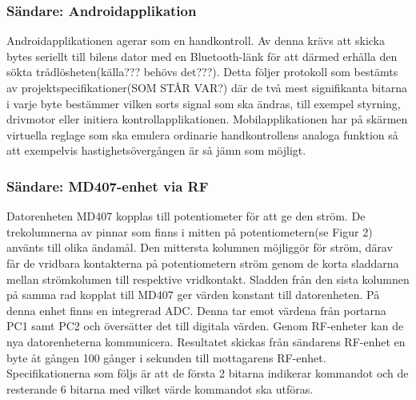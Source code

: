 \documentclass[a4paper]{article}
\begin{document}
\subsubsection{Sändare: Androidapplikation}
Androidapplikationen agerar som en handkontroll. Av denna krävs att skicka bytes seriellt till bilens dator med en Bluetooth-länk för att därmed erhålla den sökta trådlösheten(källa??? behövs det???). Detta följer protokoll som bestämts av projektspecifikationer(SOM STÅR VAR?) där de två mest signifikanta bitarna i varje byte bestämmer vilken sorts signal som ska ändras, till exempel styrning, drivmotor eller initiera kontrollapplikationen. Mobilapplikationen har på skärmen virtuella reglage som ska emulera ordinarie handkontrollens analoga funktion så att exempelvis hastighetsövergången är så jämn som möjligt.

\subsubsection{Sändare: MD407-enhet via RF}
Datorenheten MD407 kopplas till potentiometer för att ge den ström. De trekolumnerna av pinnar som finns i mitten på potentiometern(se Figur 2) använts till olika ändamål. Den mittersta kolumnen möjliggör för ström, därav får de vridbara kontakterna på potentiometern ström genom de korta sladdarna mellan strömkolumen till respektive vridkontakt. Sladden från den sista kolumnen på samma rad kopplat till MD407 ger värden konstant till datorenheten. På denna enhet finns en integrerad ADC. Denna tar emot värdena från portarna PC1 samt PC2 och översätter det till digitala värden. Genom RF-enheter kan de nya datorenheterna kommunicera. Resultatet skickas från sändarens RF-enhet en byte åt gången 100 gånger i sekunden till mottagarens RF-enhet. Specifikationerna som följs är att de första 2 bitarna indikerar kommandot och de resterande 6 bitarna med vilket värde kommandot ska utföras. 
\end{document}
